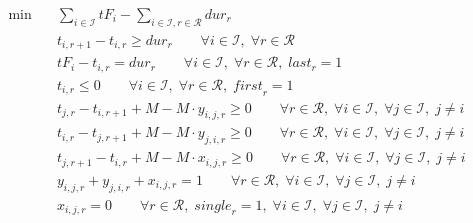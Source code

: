 \begin{align}
  \min\quad & \sum_{i \in \mathcal{I}} \mathit{tF}_{i} - \sum_{i \in \mathcal{I}, r \in \mathcal{R}} \mathit{dur}_{r} \tag{total\_delay} \\
  & t_{i,r+1} - t_{i,r} \ge \mathit{dur}_{r} \qquad \forall i \in \mathcal{I},\; \forall r \in \mathcal{R} \tag{route\_precedence} \\
  & \mathit{tF}_{i} - t_{i,r} = \mathit{dur}_{r} \qquad \forall i \in \mathcal{I},\; \forall r \in \mathcal{R},\; \mathit{last}_{r} = 1 \tag{finish\_time\_link} \\
  & t_{i,r} \le 0 \qquad \forall i \in \mathcal{I},\; \forall r \in \mathcal{R},\; \mathit{first}_{r} = 1 \tag{start\_position} \\
  & t_{j,r} - t_{i,r+1} + \mathit{M} - \mathit{M} \cdot y_{i,j,r} \ge 0 \qquad \forall r \in \mathcal{R},\; \forall i \in \mathcal{I},\; \forall j \in \mathcal{I},\; j \neq i \tag{conflict\_i\_before\_j} \\
  & t_{i,r} - t_{j,r+1} + \mathit{M} - \mathit{M} \cdot y_{j,i,r} \ge 0 \qquad \forall r \in \mathcal{R},\; \forall i \in \mathcal{I},\; \forall j \in \mathcal{I},\; j \neq i \tag{conflict\_j\_before\_i} \\
  & t_{j,r+1} - t_{i,r} + \mathit{M} - \mathit{M} \cdot x_{i,j,r} \ge 0 \qquad \forall r \in \mathcal{R},\; \forall i \in \mathcal{I},\; \forall j \in \mathcal{I},\; j \neq i \tag{conflict\_meet} \\
  & y_{i,j,r} + y_{j,i,r} + x_{i,j,r} = 1 \qquad \forall r \in \mathcal{R},\; \forall i \in \mathcal{I},\; \forall j \in \mathcal{I},\; j \neq i \tag{situation\_exclusive} \\
  & x_{i,j,r} = 0 \qquad \forall r \in \mathcal{R},\; \mathit{single}_{r} = 1,\; \forall i \in \mathcal{I},\; \forall j \in \mathcal{I},\; j \neq i \tag{unit\_capacity} \\
\end{align}
